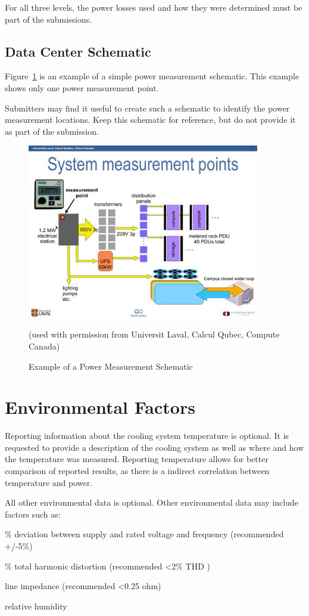 \noindent
For all three levels, the power losses used and how they were determined must be part of the submissions.

\subsection{Data Center Schematic}
\noindent
Figure~\ref{fig:powmeasschem} is an example of a simple power measurement schematic. This example shows only one power measurement point.
\wl


\noindent
Submitters may find it useful to create such a schematic to identify the power measurement locations. Keep this schematic for reference, but do not provide it as part of the submission.

\begin{figure}
\centering
\includegraphics[width=4in]{fig3-7}
\caption{Example of a Power Measurement Schematic}
(used with permission from Universit Laval, Calcul Qubec, Compute Canada)
\label{fig:powmeasschem}
\end{figure}


\section{Environmental Factors}
\label{sec:EF}
\noindent
Reporting information about the cooling system temperature is optional.
It is requested to provide a description of the cooling system as well as where and how the temperature was measured.
Reporting temperature allows for better comparison of reported results, as there is a indirect correlation between temperature and power.

\wl

\noindent
All other environmental data is optional. 
Other environmental data may include factors such as:

\begin{packed_item}
\item[{-}]
\% deviation between supply and rated voltage and frequency (recommended +/-5\%)
\item[{-}]
\% total harmonic distortion (recommended \textless 2\% THD )
\item[{-}]
line impedance (recommended \textless 0.25 ohm)
\item[{-}]
relative humidity
\end{packed_item}

